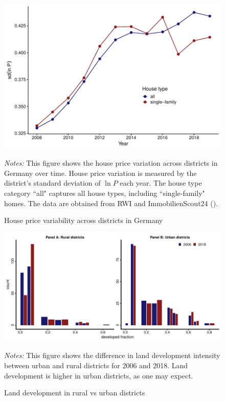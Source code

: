 \documentclass[
  12pt,
]{article}
\begin{document}
\begin{figure}[H]
\centering

\begin{center}\includegraphics{output/figs/price-variation-1} \end{center}

\caption{House price variability across districts in Germany}
\medskip
\begin{minipage}{0.9\textwidth}
\footnotesize
\textit{Notes:} This figure shows the house price variation across districts in Germany over time. House price variation is measured by the district's standard deviation of $\ln P$ each year. The house type category ``all" captures all house types, including ``single-family" homes. The data are obtained from RWI and ImmobilienScout24 (). 
\end{minipage}
\end{figure}

\begin{figure}[H]
\centering

\begin{center}\includegraphics{output/figs/developed-fraction-histogram-1} \end{center}

\caption{Land development in rural vs urban districts}\label{fig:developed-fraction-histogram}
\medskip
\begin{minipage}{0.9\textwidth}
\footnotesize
\textit{Notes:} This figure shows the difference in land development intensity between urban and rural districts for 2006 and 2018. Land development is higher in urban districts, as one may expect.
\end{minipage}
\end{figure}
\end{document}
